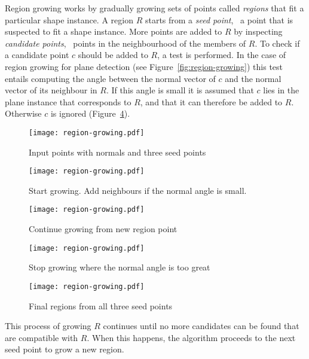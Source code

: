 Region growing works by gradually growing sets of points called \emph{regions} that fit a particular shape instance.
A region $R$ starts from a \emph{seed point}, \ie\ a point that is suspected to fit a shape instance.
More points are added to $R$ by inspecting \emph{candidate points}, \ie\ points in the neighbourhood of the members of $R$.
To check if a candidate point $c$ should be added to $R$, a test is performed.
In the case of region growing for plane detection (see Figure~\ref{fig:region-growing}) this test entails computing the angle between the normal vector of $c$ and the normal vector of its neighbour in $R$.
If this angle is small it is assumed that $c$ lies in the plane instance that corresponds to $R$, and that it can therefore be added to $R$.
Otherwise $c$ is ignored (Figure~\ref{fig:region-growing:d}).
\begin{figure*}
	\centering
	\begin{subfigure}[b]{0.3\linewidth}
		\centering
		\texttt{[image: region-growing.pdf]}
		\caption{Input points with normals and three seed points}\label{fig:region-growing:a}
	\end{subfigure}
	\qquad
	\begin{subfigure}[b]{0.3\linewidth}
		\centering
		\texttt{[image: region-growing.pdf]}
		\caption{Start growing. Add neighbours if the normal angle is small.}\label{fig:region-growing:b}
	\end{subfigure}
	\qquad
	\begin{subfigure}[b]{0.3\linewidth}
		\centering
		\texttt{[image: region-growing.pdf]}
		\caption{Continue growing from new region point}\label{fig:region-growing:c}
	\end{subfigure}
	\begin{subfigure}[b]{0.3\linewidth}
		\centering
		\texttt{[image: region-growing.pdf]}
		\caption{Stop growing where the normal angle is too great}\label{fig:region-growing:d}
	\end{subfigure}
	\qquad
	\begin{subfigure}[b]{0.3\linewidth}
		\centering
		\texttt{[image: region-growing.pdf]}
		\caption{Final regions from all three seed points}\label{fig:region-growing:e}
	\end{subfigure}
	\caption{Region growing for plane detection based on the angle between neighbouring point normals}%
\label{fig:region-growing}
\end{figure*}
This process of growing $R$ continues until no more candidates can be found that are compatible with $R$.
When this happens, the algorithm proceeds to the next seed point to grow a new region.

